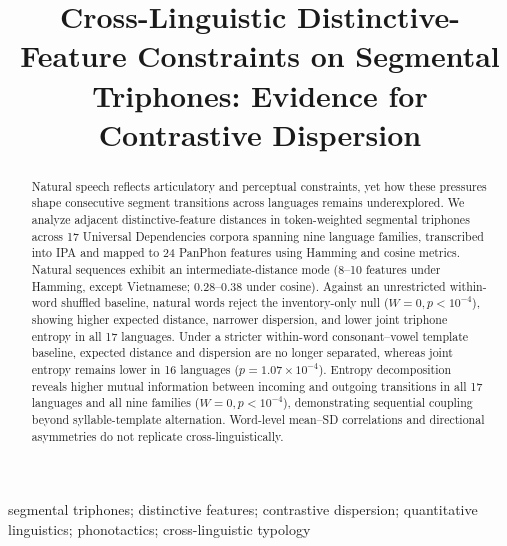\documentclass{interact}
\begin{document}

\title{Cross-Linguistic Distinctive-Feature Constraints on Segmental Triphones: Evidence for Contrastive Dispersion}

\author{
}

\maketitle

\begin{abstract}
Natural speech reflects articulatory and perceptual constraints, yet how these pressures shape consecutive segment transitions across languages remains underexplored. We analyze adjacent distinctive-feature distances in token-weighted segmental triphones across 17 Universal Dependencies corpora spanning nine language families, transcribed into IPA and mapped to 24 PanPhon features using Hamming and cosine metrics. Natural sequences exhibit an intermediate-distance mode (8--10 features under Hamming, except Vietnamese; 0.28--0.38 under cosine). Against an unrestricted within-word shuffled baseline, natural words reject the inventory-only null ($W=0, p < 10^{-4}$), showing higher expected distance, narrower dispersion, and lower joint triphone entropy in all 17 languages. Under a stricter within-word consonant--vowel template baseline, expected distance and dispersion are no longer separated, whereas joint entropy remains lower in 16 languages ($p = 1.07 \times 10^{-4}$). Entropy decomposition reveals higher mutual information between incoming and outgoing transitions in all 17 languages and all nine families ($W=0, p < 10^{-4}$), demonstrating sequential coupling beyond syllable-template alternation. Word-level mean--SD correlations and directional asymmetries do not replicate cross-linguistically.
\end{abstract}

\begin{keywords}
segmental triphones; distinctive features; contrastive dispersion; quantitative linguistics; phonotactics; cross-linguistic typology
\end{keywords}
\end{document}
